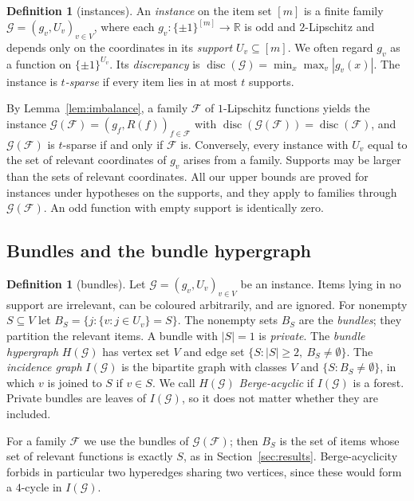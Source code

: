 \documentclass[11pt,letterpaper]{article}
\theoremstyle{definition}
\newtheorem{definition}[theorem]{Definition}
\newcommand{\R}{\mathbb{R}}
\newcommand{\cF}{\mathcal{F}}
\newcommand{\cG}{\mathcal{G}}
\newcommand{\cube}[1]{\{\pm1\}^{#1}}
\DeclareMathOperator{\disc}{disc}
\begin{document}
\begin{definition}[instances]\label{def:instance}
An \emph{instance} on the item set $[m]$ is a finite family $\cG=(g_v,U_v)_{v\in V}$, where each
$g_v\colon\cube{[m]}\to\R$ is odd and $2$-Lipschitz and depends only on the coordinates in its
\emph{support} $U_v\subseteq[m]$. We often regard $g_v$ as a function on $\cube{U_v}$. Its
\emph{discrepancy} is $\disc(\cG)=\min_{x}\max_{v}|g_v(x)|$. The instance is \emph{$t$-sparse} if
every item lies in at most $t$ supports.
\end{definition}

By Lemma~\ref{lem:imbalance}, a family $\cF$ of $1$-Lipschitz functions yields the instance
$\cG(\cF)=(g_{f},R(f))_{f\in\cF}$ with $\disc(\cG(\cF))=\disc(\cF)$, and $\cG(\cF)$ is $t$-sparse
if and only if $\cF$ is. Conversely, every instance with $U_v$ equal to the set of relevant
coordinates of $g_v$ arises from a family. Supports may be larger than the sets of relevant
coordinates. All our upper bounds are proved for instances under hypotheses on the supports, and
they apply to families through $\cG(\cF)$. An odd function with empty support is identically
zero.

\subsection{Bundles and the bundle hypergraph}

\begin{definition}[bundles]\label{def:bundles}
Let $\cG=(g_v,U_v)_{v\in V}$ be an instance. Items lying in no support are irrelevant, can be
coloured arbitrarily, and are ignored. For nonempty $S\subseteq V$ let
$B_S=\{j:\{v:j\in U_v\}=S\}$. The nonempty sets $B_S$ are the \emph{bundles}; they partition the
relevant items. A bundle with $|S|=1$ is \emph{private}. The \emph{bundle hypergraph} $H(\cG)$ has
vertex set $V$ and edge set $\{S:|S|\ge2,\ B_S\ne\emptyset\}$. The \emph{incidence graph}
$I(\cG)$ is the bipartite graph with classes $V$ and $\{S:B_S\ne\emptyset\}$, in which $v$ is
joined to $S$ if $v\in S$. We call $H(\cG)$ \emph{Berge-acyclic} if $I(\cG)$ is a forest. Private
bundles are leaves of $I(\cG)$, so it does not matter whether they are included.
\end{definition}

For a family $\cF$ we use the bundles of $\cG(\cF)$; then $B_S$ is the set of items whose set of
relevant functions is exactly $S$, as in Section~\ref{sec:results}. Berge-acyclicity forbids in
particular two hyperedges sharing two vertices, since these would form a $4$-cycle in $I(\cG)$.
\end{document}
